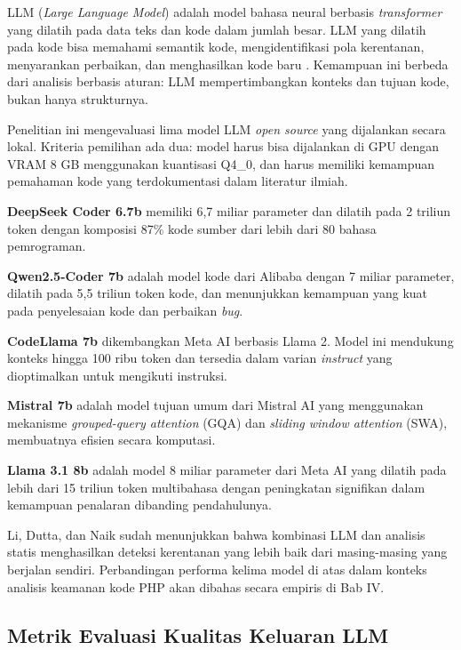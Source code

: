     LLM (\textit{Large Language Model}) adalah model bahasa neural berbasis \textit{transformer} yang dilatih pada data teks dan kode dalam jumlah besar. LLM yang dilatih pada kode bisa memahami semantik kode, mengidentifikasi pola kerentanan, menyarankan perbaikan, dan menghasilkan kode baru \cite{akuthota2023vulnerability}. Kemampuan ini berbeda dari analisis berbasis aturan: LLM mempertimbangkan konteks dan tujuan kode, bukan hanya strukturnya.

    Penelitian ini mengevaluasi lima model LLM \textit{open source} yang dijalankan secara lokal. Kriteria pemilihan ada dua: model harus bisa dijalankan di GPU dengan VRAM 8 GB menggunakan kuantisasi Q4\_0, dan harus memiliki kemampuan pemahaman kode yang terdokumentasi dalam literatur ilmiah.

    \textbf{DeepSeek Coder 6.7b} \cite{deepseek2024coder} memiliki 6,7 miliar parameter dan dilatih pada 2 triliun token dengan komposisi 87\% kode sumber dari lebih dari 80 bahasa pemrograman.

    \textbf{Qwen2.5-Coder 7b} \cite{hui2024qwen} adalah model kode dari Alibaba dengan 7 miliar parameter, dilatih pada 5,5 triliun token kode, dan menunjukkan kemampuan yang kuat pada penyelesaian kode dan perbaikan \textit{bug}.

    \textbf{CodeLlama 7b} \cite{roziere2024codellama} dikembangkan Meta AI berbasis Llama 2. Model ini mendukung konteks hingga 100 ribu token dan tersedia dalam varian \textit{instruct} yang dioptimalkan untuk mengikuti instruksi.

    \textbf{Mistral 7b} \cite{jiang2023mistral} adalah model tujuan umum dari Mistral AI yang menggunakan mekanisme \textit{grouped-query attention} (GQA) dan \textit{sliding window attention} (SWA), membuatnya efisien secara komputasi.

    \textbf{Llama 3.1 8b} \cite{dubey2024llama3} adalah model 8 miliar parameter dari Meta AI yang dilatih pada lebih dari 15 triliun token multibahasa dengan peningkatan signifikan dalam kemampuan penalaran dibanding pendahulunya.

    Li, Dutta, dan Naik \cite{li2025iris} sudah menunjukkan bahwa kombinasi LLM dan analisis statis menghasilkan deteksi kerentanan yang lebih baik dari masing-masing yang berjalan sendiri. Perbandingan performa kelima model di atas dalam konteks analisis keamanan kode PHP akan dibahas secara empiris di Bab IV.

    \subsection{Metrik Evaluasi Kualitas Keluaran LLM}
    \label{subsec:metrik-llm}


